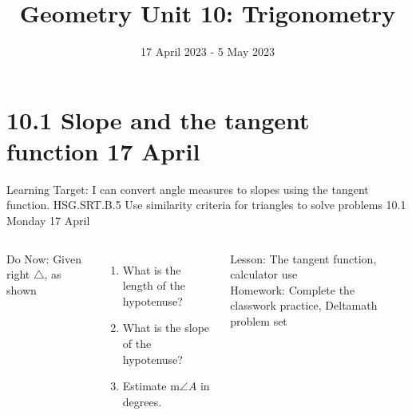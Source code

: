 \documentclass[onlytextwidth, aspectratio=169]{beamer}
\title{Geometry Unit 10: Trigonometry}
\date{17 April 2023 - 5 May 2023}
\begin{document}
\frame{\titlepage}
\section[Outline]{}
\frame{\tableofcontents}

\section{10.1 Slope and the tangent function \hfill 17 April \,}
\begin{frame}{Learning Target: I can convert angle measures to slopes using the tangent function.}
  {HSG.SRT.B.5 Use similarity criteria for triangles to solve problems \hfill \alert{10.1 Monday 17 April}}
  \begin{columns}
    Do Now: Given right $\triangle$, as shown
    \begin{enumerate}
      \item What is the length of the hypotenuse?
      \item What is the slope of the hypotenuse?
      \item Estimate m$\angle A$ in degrees.
    \end{enumerate} \vspace{0.5cm}
    Lesson: The tangent function, calculator use \\[0.5cm]
    Homework: Complete the classwork practice, Deltamath problem set
    \begin{flushright}
    \end{flushright}
  \end{columns}
\end{frame}
\end{document}
